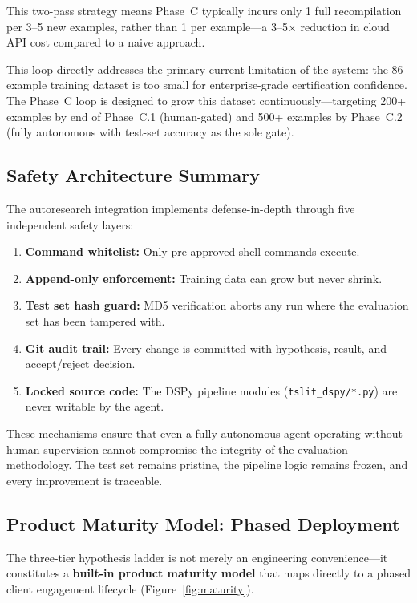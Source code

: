 \documentclass[11pt]{article}
\begin{document}
This two-pass strategy means Phase~C typically incurs only 1 full
recompilation per 3--5 new examples, rather than 1 per example---a
3--5$\times$ reduction in cloud API cost compared to a naive approach.

This loop directly addresses the primary current limitation of the system:
the 86-example training dataset is too small for enterprise-grade
certification confidence. The Phase~C loop is designed to grow this
dataset continuously---targeting 200+ examples by end of Phase~C.1
(human-gated) and 500+ examples by Phase~C.2 (fully autonomous with
test-set accuracy as the sole gate).

\subsection{Safety Architecture Summary}

The autoresearch integration implements defense-in-depth through five
independent safety layers:

\begin{enumerate}[leftmargin=2em]
  \item \textbf{Command whitelist:} Only pre-approved shell commands execute.
  \item \textbf{Append-only enforcement:} Training data can grow but never shrink.
  \item \textbf{Test set hash guard:} MD5 verification aborts any run where
  the evaluation set has been tampered with.
  \item \textbf{Git audit trail:} Every change is committed with hypothesis,
  result, and accept/reject decision.
  \item \textbf{Locked source code:} The DSPy pipeline modules
  (\texttt{tslit\_dspy/*.py}) are never writable by the agent.
\end{enumerate}

These mechanisms ensure that even a fully autonomous agent operating
without human supervision cannot compromise the integrity of the
evaluation methodology. The test set remains pristine, the pipeline
logic remains frozen, and every improvement is traceable.

\subsection{Product Maturity Model: Phased Deployment}
\label{sec:maturity}

The three-tier hypothesis ladder is not merely an engineering
convenience---it constitutes a \textbf{built-in product maturity model}
that maps directly to a phased client engagement lifecycle
(Figure~\ref{fig:maturity}).
\end{document}
